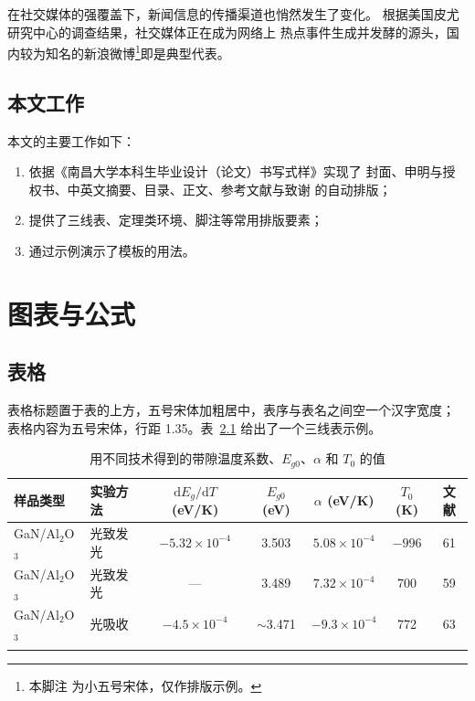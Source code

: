 \documentclass[official]{ncubachelor}
\begin{document}
在社交媒体的强覆盖下，新闻信息的传播渠道也悄然发生了变化。
根据美国皮尤研究中心的调查结果\cite{pew}，社交媒体正在成为网络上
热点事件生成并发酵的源头，国内较为知名的新浪微博\footnote{本脚注
为小五号宋体，仅作排版示例。}即是典型代表。

\section{本文工作}

本文的主要工作如下：
\begin{enumerate}
  \item 依据《南昌大学本科生毕业设计（论文）书写式样》实现了
        封面、申明与授权书、中英文摘要、目录、正文、参考文献与致谢
        的自动排版；
  \item 提供了三线表、定理类环境、脚注等常用排版要素；
  \item 通过示例演示了模板的用法。
\end{enumerate}

\zhlipsum[3-7]

\chapter{图表与公式}\label{chap:figtab}

\section{表格}

表格标题置于表的上方，五号宋体加粗居中，表序与表名之间空一个汉字宽度；
表格内容为五号宋体，行距 1.35。表~\ref{tab:demo} 给出了一个三线表示例。

\begin{table}[htb]
  \centering
  \caption{用不同技术得到的带隙温度系数、$E_{g0}$、$\alpha$ 和 $T_0$ 的值}
  \label{tab:demo}
  \begin{tabular}{llccccc}
    \thickhline
    样品类型 & 实验方法 & $\mathrm{d}E_g/\mathrm{d}T$ (eV/K) &
    $E_{g0}$(eV) & $\alpha$ (eV/K) & $T_0$(K) & 文献 \\
    \hline
    GaN/Al$_2$O$_3$ & 光致发光 & $-5.32\times 10^{-4}$ & 3.503 &
    $5.08\times 10^{-4}$ & $-996$ & 61 \\
    GaN/Al$_2$O$_3$ & 光致发光 & —                      & 3.489 &
    $7.32\times 10^{-4}$ & 700   & 59 \\
    GaN/Al$_2$O$_3$ & 光吸收   & $-4.5\times 10^{-4}$   & $\sim$3.471 &
    $-9.3\times 10^{-4}$ & 772   & 63 \\
    \thickhline
  \end{tabular}
\end{table}
\end{document}
